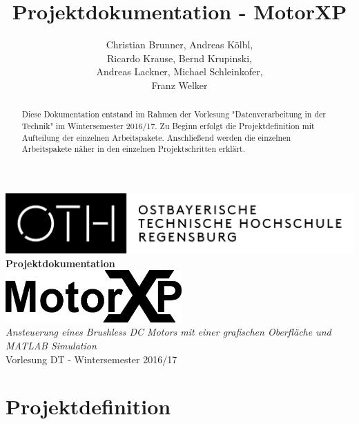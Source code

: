 \documentclass[a4paper,11pt]{report}
\title{Projektdokumentation - MotorXP}
\author{Christian Brunner, Andreas Kölbl, \\
  Ricardo Krause, Bernd Krupinski, \\
  Andreas Lackner, Michael Schleinkofer, \\
  Franz Welker}
\begin{document}
\makeatletter
\begin{titlepage}
  \centering
  \vspace*{0.02\textheight}
  \includegraphics[width=\textwidth]{images/OTHLogo}\vspace*{0.1\textheight}
  {\huge\textbf{\\Projektdokumentation\\}}\vspace*{0.05\textheight}
  \includegraphics[height=2cm]{images/MotorXP}\vspace*{0.05\textheight}
  {\large\textit{\\Ansteuerung eines Brushless DC Motors mit einer grafischen Oberfläche und MATLAB Simulation}}\vspace*{0.03\textheight}
  {\\Vorlesung DT - Wintersemester 2016/17\\}\vspace*{0.2\textheight}
  {\@author}
\end{titlepage}
\makeatother
\tableofcontents

\begin{abstract}
Diese Dokumentation entstand im Rahmen der Vorlesung "Datenverarbeitung in der Technik" im Wintersemester 2016/17. Zu Beginn erfolgt die
Projektdefinition mit Aufteilung der einzelnen Arbeitspakete. Anschließend werden die einzelnen Arbeitspakete näher in den einzelnen Projektschritten erklärt.
\end{abstract}

\chapter{Projektdefinition}




\listoffigures
\listoftables
\appendix


\end{document}
